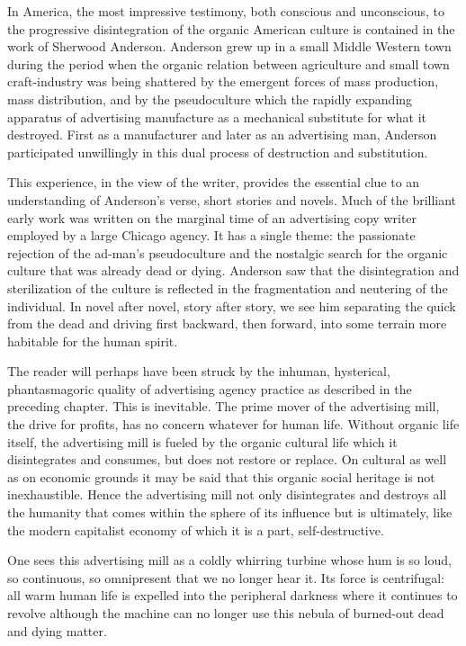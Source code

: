 \documentclass[openany,nobib]{tufte-book}
\begin{document}
In America, the most impressive testimony, both conscious and
unconscious, to the progressive disintegration of the organic American
culture is contained in the work of Sherwood Anderson. Anderson grew up
in a small Middle Western town during the period when the organic
relation between agriculture and small town craft-industry was being
shattered by the emergent forces of mass production, mass distribution,
and by the pseudoculture which the rapidly expanding apparatus of
advertising manufacture as a mechanical substitute for what it
destroyed. First as a manufacturer and later as an advertising man,
Anderson participated unwillingly in this dual process of destruction
and substitution.

This experience, in the view of the writer, provides the essential clue
to an understanding of Anderson's verse, short stories and novels. Much
of the brilliant early work was written on the marginal time of an
advertising copy writer employed by a large Chicago agency. It has a
single theme: the passionate rejection of the ad-man's pseudoculture and
the nostalgic search for the organic culture that was already dead or
dying. Anderson saw that the disintegration and sterilization of the
culture is reflected in the fragmentation and neutering of the
individual. In novel after novel, story after story, we see him
separating the quick from the dead and driving first backward, then
forward, into some terrain more habitable for the human spirit.

The reader will perhaps have been struck by the inhuman, hysterical,
phantasmagoric quality of advertising agency practice as described in
the preceding chapter. This is inevitable. The prime mover of the
advertising mill, the drive for profits, has no concern whatever for
human life. Without organic life itself, the advertising mill is fueled
by the organic cultural life which it disintegrates and consumes, but
does not restore or replace. On cultural as well as on economic grounds
it may be said that this organic social heritage is not inexhaustible.
Hence the advertising mill not only disintegrates and destroys all the
humanity that comes within the sphere of its influence but is
ultimately, like the modern capitalist economy of which it is a part,
self-destructive.

One sees this advertising mill as a coldly whirring turbine whose hum is
so loud, so continuous, so omnipresent that we no longer hear it. Its
force is centrifugal: all warm human life is expelled into the
peripheral darkness where it continues to revolve although the machine
can no longer use this nebula of burned-out dead and dying matter.
\end{document}
